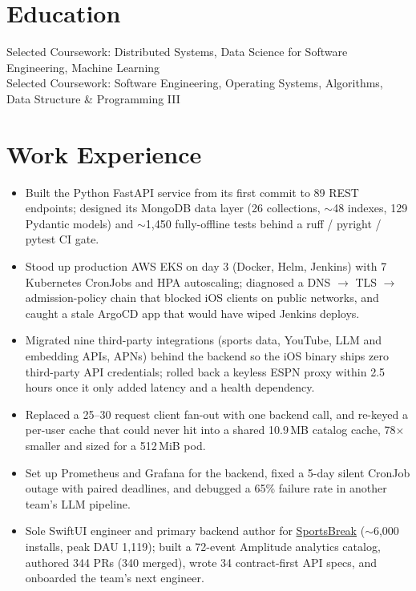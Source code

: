 \documentclass[11pt, letterpaper]{article}
\begin{document}

\section{Education}
Selected Coursework: Distributed Systems, Data Science for Software Engineering, Machine Learning\\[1pt]
Selected Coursework: Software Engineering, Operating Systems, Algorithms, Data Structure \& Programming III

\section{Work Experience}
\begin{itemize}
  \item Built the Python FastAPI service from its first commit to 89 REST endpoints; designed its MongoDB data layer (26 collections, $\sim$48 indexes, 129 Pydantic models) and $\sim$1{,}450 fully-offline tests behind a ruff / pyright / pytest CI gate.
  \item Stood up production AWS EKS on day 3 (Docker, Helm, Jenkins) with 7 Kubernetes CronJobs and HPA autoscaling; diagnosed a DNS $\to$ TLS $\to$ admission-policy chain that blocked iOS clients on public networks, and caught a stale ArgoCD app that would have wiped Jenkins deploys.
  \item Migrated nine third-party integrations (sports data, YouTube, LLM and embedding APIs, APNs) behind the backend so the iOS binary ships zero third-party API credentials; rolled back a keyless ESPN proxy within 2.5 hours once it only added latency and a health dependency.
  \item Replaced a 25--30 request client fan-out with one backend call, and re-keyed a per-user cache that could never hit into a shared 10.9\,MB catalog cache, 78$\times$ smaller and sized for a 512\,MiB pod.
  \item Set up Prometheus and Grafana for the backend, fixed a 5-day silent CronJob outage with paired deadlines, and debugged a 65\% failure rate in another team's LLM pipeline.
  \item Sole SwiftUI engineer and primary backend author for \href{https://apps.apple.com/app/id6762649287}{SportsBreak} ($\sim$6{,}000 installs, peak DAU 1{,}119); built a 72-event Amplitude analytics catalog, authored 344 PRs (340 merged), wrote 34 contract-first API specs, and onboarded the team's next engineer.
\end{itemize}
\end{document}
